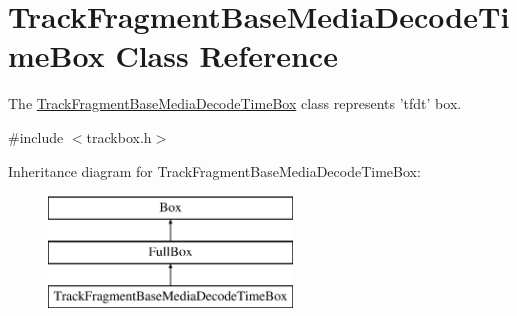 \hypertarget{class_track_fragment_base_media_decode_time_box}{\section{Track\-Fragment\-Base\-Media\-Decode\-Time\-Box Class Reference}
\label{class_track_fragment_base_media_decode_time_box}
}


The \hyperlink{class_track_fragment_base_media_decode_time_box}{Track\-Fragment\-Base\-Media\-Decode\-Time\-Box} class represents 'tfdt' box.  




{\ttfamily \#include $<$trackbox.\-h$>$}

Inheritance diagram for Track\-Fragment\-Base\-Media\-Decode\-Time\-Box\-:\begin{figure}[H]
\begin{center}
\leavevmode
\includegraphics[height=3.000000cm]{class_track_fragment_base_media_decode_time_box}
\end{center}
\end{figure}
